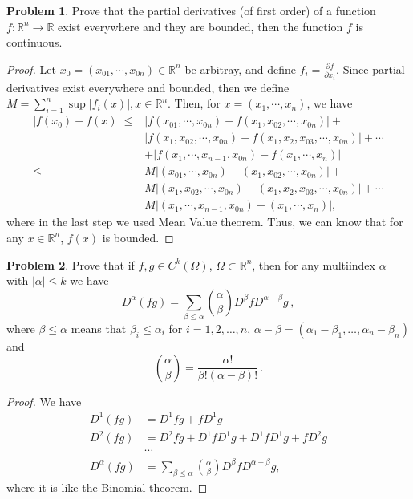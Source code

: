 \documentclass[11pt]{article}
\theoremstyle{definition}
\newtheorem{problem}{Problem}
\theoremstyle{definition}
\begin{document}
\medskip

\begin{problem}
Prove that the partial derivatives (of first order) of a function
$f:\mathbb{R}^n\to\mathbb{R}$ exist everywhere and they are bounded, then the function $f$ is continuous.
\end{problem}
\begin{proof}
Let $x_0 = (x_{01},\cdots,x_{0n}) \in \mathbb{R}^n$ be arbitray, and define $f_i = \frac{\partial f}{\partial x_i}$. Since partial derivatives exist everywhere and bounded, then we define $M = \sum^n_{i=1}\sup |f_i(x)|, x\in \mathbb{R}^n$. Then, for $x = (x_1,\cdots,x_n)$, we have
\begin{align*}
    |f(x_0) - f(x)| \leq & |f(x_{01},\cdots,x_{0n}) - f(x_1, x_{02}, \cdots, x_{0n})| + \\
    & |f(x_1, x_{02}, \cdots, x_{0n}) - f(x_1, x_{2}, x_{03}, \cdots, x_{0n})| + \cdots  \\
    & + |f(x_{1},\cdots, x_{n-1}, x_{0n}) - f(x_1, \cdots, x_n)| \\
    \leq & M |(x_{01},\cdots,x_{0n}) - (x_1, x_{02}, \cdots, x_{0n})| + \\
    & M |(x_1, x_{02}, \cdots, x_{0n}) - (x_1, x_{2}, x_{03}, \cdots, x_{0n})| + \cdots  \\
    & M |(x_{1},\cdots, x_{n-1}, x_{0n}) - (x_1, \cdots, x_n)|,
\end{align*}
where in the last step we used Mean Value theorem. Thus, we can know that for any $x\in \mathbb{R}^n$, $f(x)$ is bounded.
\end{proof}

\medskip

\begin{problem}
Prove that if $f,g\in C^k(\Omega)$, $\Omega\subset\mathbb{R}^n$, then for any multiindex
$\alpha$ with $|\alpha|\leq k$ we have
$$
D^\alpha(fg)=\sum_{\beta\leq \alpha}\binom{\alpha}{\beta}D^\beta f D^{\alpha-\beta}g\, ,
$$
where
$\beta\leq\alpha$ means that $\beta_i\leq\alpha_i$ for $i=1,2,\ldots,n$,
$\alpha-\beta=(\alpha_1-\beta_1,\ldots,\alpha_n-\beta_n)$ and 
$$
\binom{\alpha}{\beta}=\frac{\alpha!}{\beta!(\alpha-\beta)!}\, .
$$
\end{problem}
\begin{proof}
We have
\begin{align*}
    D^1(fg) & = D^1f g + f D^1 g \\
    D^2(fg) & = D^2f g + D^1 f D^1 g + D^1 f D^1 g + f D^2 g \\
    & \cdots \\
    D^\alpha(fg) & = \sum_{\beta\leq \alpha}\binom{\alpha}{\beta}D^\beta f D^{\alpha-\beta}g,
\end{align*}
where it is like the Binomial theorem.
\end{proof}
\end{document}
